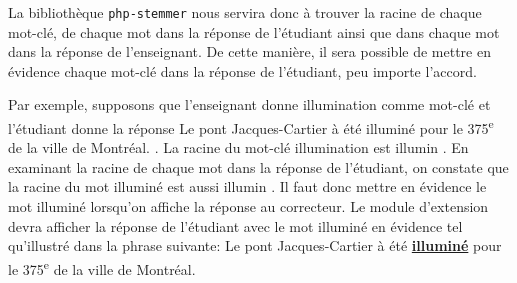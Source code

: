 La biblioth\`eque \texttt{php-stemmer} nous servira donc \`a trouver la racine de chaque mot-cl\'e, de chaque mot dans la r\'eponse de l'\'etudiant ainsi que dans chaque mot dans la r\'eponse de l'enseignant.
De cette mani\`ere, il sera possible de mettre en \'evidence chaque mot-cl\'e dans la r\'eponse de l'\'etudiant, peu importe l'accord.

Par exemple, supposons que l'enseignant donne \og illumination \fg{} comme mot-cl\'e et l'\'etudiant donne la r\'eponse \og Le pont Jacques-Cartier \`a \'et\'e illumin\'e pour le 375\textsuperscript{e} de la ville de Montr\'eal. \fg{}.
La racine du mot-cl\'e \og illumination \fg{}  est \og illumin \fg{}.
En examinant la racine de chaque mot dans la r\'eponse de l'\'etudiant, on constate que la racine du mot \og illumin\'e \fg{} est aussi \og illumin \fg{}.
Il faut donc mettre en \'evidence le mot \og illumin\'e \fg{} lorsqu'on affiche la r\'eponse au correcteur.
Le module d'extension devra afficher la r\'eponse de l'\'etudiant avec le mot illumin\'e en \'evidence tel qu'illustr\'e dans la phrase suivante: \og Le pont Jacques-Cartier \`a \'et\'e \textbf{\underline{illumin\'e}} pour le 375\textsuperscript{e} de la ville de Montr\'eal. \fg{} 
